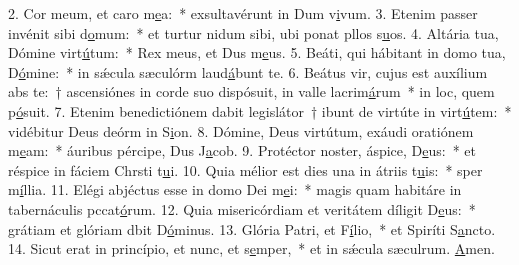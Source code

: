 2. Cor meum, et caro m\uline{e}a:~* exsultavérunt in Dum v\uline{i}vum.
3. Etenim passer invénit sibi d\uline{o}mum:~* et turtur nidum sibi, ubi ponat pllos s\uline{u}os.
4. Altária tua, Dómine virt\uline{ú}tum:~* Rex meus, et Dus m\uline{e}us.
5. Beáti, qui hábitant in domo tua, D\uline{ó}mine:~* in sǽcula sæculórm laud\uline{á}bunt te.
6. Beátus vir, cujus est auxílium abs te:~† ascensiónes in corde suo dispósuit, in valle lacrim\uline{á}rum~* in loc, quem p\uline{ó}suit.
7. Etenim benedictiónem dabit legislátor~† ibunt de virtúte in virt\uline{ú}tem:~* vidébitur Deus deórm in S\uline{i}on.
8. Dómine, Deus virtútum, exáudi oratiónem m\uline{e}am:~* áuribus pércipe, Dus J\uline{a}cob.
9. Protéctor noster, áspice, D\uline{e}us:~* et réspice in fáciem Chrsti t\uline{u}i.
10. Quia mélior est dies una in átriis t\uline{u}is:~* sper m\uline{í}llia.
11. Elégi abjéctus esse in domo Dei m\uline{e}i:~* magis quam habitáre in tabernáculis pccat\uline{ó}rum.
12. Quia misericórdiam et veritátem díligit D\uline{e}us:~* grátiam et glóriam dbit D\uline{ó}minus.
13. Glória Patri, et F\uline{í}lio,~* et Spiríti S\uline{a}ncto.
14. Sicut erat in princípio, et nunc, et s\uline{e}mper,~* et in sǽcula sæculrum. \uline{A}men.
